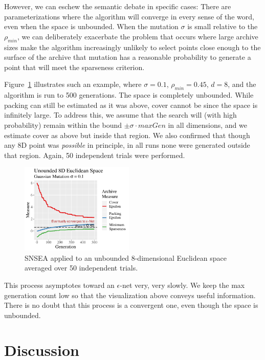 \documentclass[twoside]{article}
\begin{document}
However, we can eschew the semantic debate in specific cases:  There are parameterizations where the algorithm will converge in every sense of the word, even when the space is unbounded.  When the mutation $\sigma$ is small relative to the $\rho_{min}$, we can deliberately exacerbate the problem that occurs where large archive sizes make the algorithm increasingly unlikely to select points close enough to the surface of the archive that mutation has a reasonable probability to generate a point that will meet the sparseness criterion.

Figure~\ref{fig:unbounded} illustrates such an example, where $\sigma=0.1$, $\rho_{min}= 0.45$, $d=8$, and the algorithm is run to 500 generations.  The space is completely unbounded.  While packing can still be estimated as it was above, cover cannot be since the space is infinitely large.  To address this, we assume that the search will (with high probability) remain within the bound $\pm\sigma\cdot maxGen$ in all dimensions, and we estimate cover as above but inside that region.  We also confirmed that though any 8D point was \emph{possible} in principle, in all runs none were generated outside that region.  Again, 50 independent trials were performed.
%
\begin{figure}[t]
\includegraphics[width=0.48\textwidth]{Figures/unbounded-r-01-s-045.pdf}
\caption{\label{fig:unbounded} SNSEA applied to an unbounded 8-dimensional Euclidean space averaged over 50 independent trials.}
\end{figure}
%
This process asymptotes toward an $\epsilon$-net very, very slowly.  We keep the max generation count low so that the visualization above conveys useful information.  There is no doubt that this process is a convergent one, even though the space is unbounded.


\section{Discussion}
\label{sec:discussion}
\end{document}
